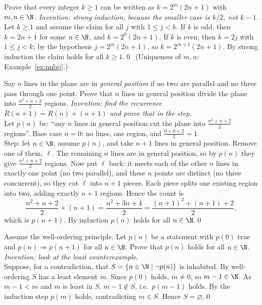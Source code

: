 \begin{bexample}\label{ex:twoadic}
Prove that every integer $k\ge1$ can be written as $k=2^m(2n+1)$ with $m,n\in\N$.
\solution
\emph{Invention: strong induction, because the smaller case is $k/2$, not $k-1$.}\\
Let $k\ge1$ and assume the claim for all $j$ with $1\le j<k$. If $k$ is odd, then $k=2n+1$ for some $n\in\N$, and $k=2^0(2n+1)$. If $k$ is even, then $k=2j$ with $1\le j<k$; by the hypothesis $j=2^m(2n+1)$, so $k=2^{m+1}(2n+1)$. By strong induction the claim holds for all $k\ge1$.\qed\ (Uniqueness of $m,n$: Example~\ref{ex:nnbij}.)
\end{bexample}

\begin{bexample}
Say $n$ lines in the plane are in \emph{general position} if no two are parallel and no three pass through one point. Prove that $n$ lines in general position divide the plane into $\frac{n^2+n+2}2$ regions.
\solution
\emph{Invention: find the recurrence $R(n+1)=R(n)+(n+1)$ and prove that in the step.}\\
Let $p(n)$ be: ``any $n$ lines in general position cut the plane into $\frac{n^2+n+2}2$ regions''. Base case $n=0$: no lines, one region, and $\frac{0+0+2}2=1$.\\
Step: let $n\in\N$, assume $p(n)$, and take $n+1$ lines in general position. Remove one of them, $\ell$. The remaining $n$ lines are in general position, so by $p(n)$ they give $\frac{n^2+n+2}2$ regions. Now put $\ell$ back: it meets each of the other $n$ lines in exactly one point (no two parallel), and these $n$ points are distinct (no three concurrent), so they cut $\ell$ into $n+1$ pieces. Each piece splits one existing region into two, adding exactly $n+1$ regions. Hence the count is
\[
\frac{n^2+n+2}2+(n+1)=\frac{n^2+3n+4}2=\frac{(n+1)^2+(n+1)+2}2,
\]
which is $p(n+1)$. By induction $p(n)$ holds for all $n\in\N$.\qed
\end{bexample}

\begin{bexample}
Assume the well-ordering principle. Let $p(n)$ be a statement with $p(0)$ true and $p(n)\Rightarrow p(n+1)$ for all $n\in\N$. Prove that $p(n)$ holds for all $n\in\N$.
\solution
\emph{Invention: look at the least counterexample.}\\
Suppose, for a contradiction, that $S=\{n\in\N\mid\neg p(n)\}$ is inhabited. By well-ordering $S$ has a least element $m$. Since $p(0)$ holds, $m\ne0$, so $m-1\in\N$. As $m-1<m$ and $m$ is least in $S$, $m-1\notin S$, i.e.\ $p(m-1)$ holds. By the induction step $p(m)$ holds, contradicting $m\in S$. Hence $S=\varnothing$.\qed
\end{bexample}

